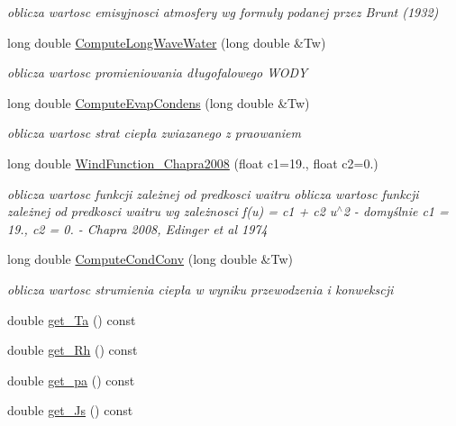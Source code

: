 \begin{DoxyCompactItemize}
\begin{DoxyCompactList}\small\item\em oblicza wartosc emisyjnosci atmosfery wg formuły podanej przez Brunt (1932) \end{DoxyCompactList}\item 
long double \hyperlink{class_net_heat_flux_a867bd311aaaf67ba057ad24f8e8ba5af}{Compute\+Long\+Wave\+Water} (long double \&Tw)
\begin{DoxyCompactList}\small\item\em oblicza wartosc promieniowania długofalowego W\+O\+D\+Y \end{DoxyCompactList}\item 
long double \hyperlink{class_net_heat_flux_a7029244ff808627ebc74a9e74d00abe4}{Compute\+Evap\+Condens} (long double \&Tw)
\begin{DoxyCompactList}\small\item\em oblicza wartosc strat ciepła zwiazanego z praowaniem \end{DoxyCompactList}\item 
long double \hyperlink{class_net_heat_flux_a3209796cc63c1b6f1d8040f7bb815053}{Wind\+Function\+\_\+\+Chapra2008} (float c1=19., float c2=0.)
\begin{DoxyCompactList}\small\item\em oblicza wartosc funkcji zależnej od predkosci waitru oblicza wartosc funkcji zależnej od predkosci waitru wg zależnosci f(u) = c1 + c2 u$^\wedge$2 -\/ domyślnie c1 = 19., c2 = 0. -\/ Chapra 2008, Edinger et al 1974 \end{DoxyCompactList}\item 
long double \hyperlink{class_net_heat_flux_ab3807fc076b38645302be22d62c70c65}{Compute\+Cond\+Conv} (long double \&Tw)
\begin{DoxyCompactList}\small\item\em oblicza wartosc strumienia ciepła w wyniku przewodzenia i konwekscji \end{DoxyCompactList}\item 
double \hyperlink{class_net_heat_flux_a495d266066abc2afdfc6f67e73e9f5d6}{get\+\_\+\+Ta} () const 
\item 
double \hyperlink{class_net_heat_flux_aaf841691bf132c9b7d26c7ff3a60b798}{get\+\_\+\+Rh} () const 
\item 
double \hyperlink{class_net_heat_flux_ab6d1ce8e3f2f4034c256bd32b9285b01}{get\+\_\+pa} () const 
\item 
double \hyperlink{class_net_heat_flux_a37bddd6b4413bf9a4265b0e6121dc53a}{get\+\_\+\+Js} () const 

\end{DoxyCompactItemize}
